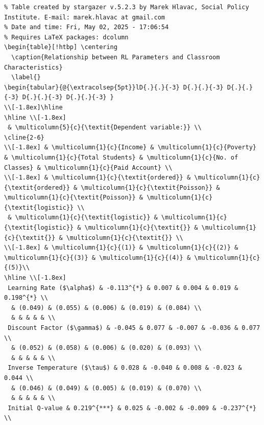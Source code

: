 \documentclass[
  number,
  preprint,
  3p,
  onecolumn]{elsarticle}
\begin{document}
\begin{table}
{\begin{verbatim}
% Table created by stargazer v.5.2.3 by Marek Hlavac, Social Policy Institute. E-mail: marek.hlavac at gmail.com
% Date and time: Fri, May 02, 2025 - 17:06:54
% Requires LaTeX packages: dcolumn 
\begin{table}[!htbp] \centering 
  \caption{Relationship between RL Parameters and Classroom Characteristics} 
  \label{} 
\begin{tabular}{@{\extracolsep{5pt}}lD{.}{.}{-3} D{.}{.}{-3} D{.}{.}{-3} D{.}{.}{-3} D{.}{.}{-3} } 
\\[-1.8ex]\hline 
\hline \\[-1.8ex] 
 & \multicolumn{5}{c}{\textit{Dependent variable:}} \\ 
\cline{2-6} 
\\[-1.8ex] & \multicolumn{1}{c}{Income} & \multicolumn{1}{c}{Poverty} & \multicolumn{1}{c}{Total Students} & \multicolumn{1}{c}{No. of Classes} & \multicolumn{1}{c}{Paid Account} \\ 
\\[-1.8ex] & \multicolumn{1}{c}{\textit{ordered}} & \multicolumn{1}{c}{\textit{ordered}} & \multicolumn{1}{c}{\textit{Poisson}} & \multicolumn{1}{c}{\textit{Poisson}} & \multicolumn{1}{c}{\textit{logistic}} \\ 
 & \multicolumn{1}{c}{\textit{logistic}} & \multicolumn{1}{c}{\textit{logistic}} & \multicolumn{1}{c}{\textit{}} & \multicolumn{1}{c}{\textit{}} & \multicolumn{1}{c}{\textit{}} \\ 
\\[-1.8ex] & \multicolumn{1}{c}{(1)} & \multicolumn{1}{c}{(2)} & \multicolumn{1}{c}{(3)} & \multicolumn{1}{c}{(4)} & \multicolumn{1}{c}{(5)}\\ 
\hline \\[-1.8ex] 
 Learning Rate ($\alpha$) & -0.113^{*} & 0.007 & 0.004 & 0.019 & 0.198^{*} \\ 
  & (0.049) & (0.055) & (0.006) & (0.019) & (0.084) \\ 
  & & & & & \\ 
 Discount Factor ($\gamma$) & -0.045 & 0.077 & -0.007 & -0.036 & 0.077 \\ 
  & (0.052) & (0.058) & (0.006) & (0.020) & (0.093) \\ 
  & & & & & \\ 
 Inverse Temperature ($\tau$) & 0.028 & -0.040 & 0.008 & -0.023 & 0.044 \\ 
  & (0.046) & (0.049) & (0.005) & (0.019) & (0.070) \\ 
  & & & & & \\ 
 Initial Q-value & 0.219^{***} & 0.025 & -0.002 & -0.009 & -0.237^{*} \\ 

\end{verbatim}}
\end{table}
\end{document}
